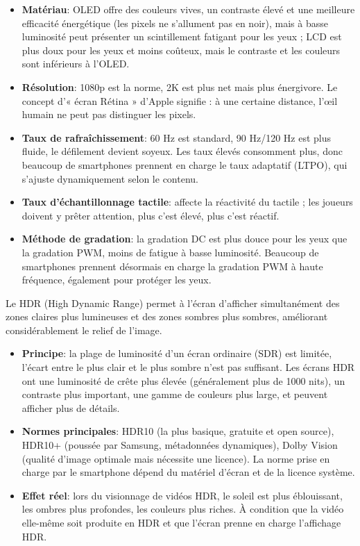 \begin{itemize}
  \item \textbf{Matériau}: OLED offre des couleurs vives, un contraste élevé et une meilleure efficacité énergétique (les pixels ne s'allument pas en noir), mais à basse luminosité peut présenter un scintillement fatigant pour les yeux ; LCD est plus doux pour les yeux et moins coûteux, mais le contraste et les couleurs sont inférieurs à l'OLED.
  \item \textbf{Résolution}: 1080p est la norme, 2K est plus net mais plus énergivore. Le concept d'« écran Rétina » d'Apple signifie : à une certaine distance, l'œil humain ne peut pas distinguer les pixels.
  \item \textbf{Taux de rafraîchissement}: 60 Hz est standard, 90 Hz/120 Hz est plus fluide, le défilement devient soyeux. Les taux élevés consomment plus, donc beaucoup de smartphones prennent en charge le taux adaptatif (LTPO), qui s'ajuste dynamiquement selon le contenu.
  \item \textbf{Taux d'échantillonnage tactile}: affecte la réactivité du tactile ; les joueurs doivent y prêter attention, plus c'est élevé, plus c'est réactif.
  \item \textbf{Méthode de gradation}: la gradation DC est plus douce pour les yeux que la gradation PWM, moins de fatigue à basse luminosité. Beaucoup de smartphones prennent désormais en charge la gradation PWM à haute fréquence, également pour protéger les yeux.
\end{itemize}


Le HDR (High Dynamic Range) permet à l'écran d'afficher simultanément des zones claires plus lumineuses et des zones sombres plus sombres, améliorant considérablement le relief de l'image.

\begin{itemize}
  \item \textbf{Principe}: la plage de luminosité d'un écran ordinaire (SDR) est limitée, l'écart entre le plus clair et le plus sombre n'est pas suffisant. Les écrans HDR ont une luminosité de crête plus élevée (généralement plus de 1000 nits), un contraste plus important, une gamme de couleurs plus large, et peuvent afficher plus de détails.
  \item \textbf{Normes principales}: HDR10 (la plus basique, gratuite et open source), HDR10+ (poussée par Samsung, métadonnées dynamiques), Dolby Vision (qualité d'image optimale mais nécessite une licence). La norme prise en charge par le smartphone dépend du matériel d'écran et de la licence système.
  \item \textbf{Effet réel}: lors du visionnage de vidéos HDR, le soleil est plus éblouissant, les ombres plus profondes, les couleurs plus riches. À condition que la vidéo elle-même soit produite en HDR et que l'écran prenne en charge l'affichage HDR.
\end{itemize}

